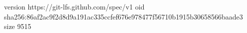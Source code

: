 version https://git-lfs.github.com/spec/v1
oid sha256:86af2ac9f2d8d9a191ac335ccfef676e978477f56710b1915b30658566baade3
size 9515
